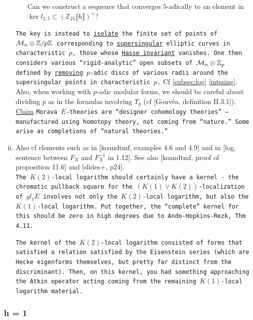 \documentclass{rs}
\theoremstyle{definition}
\theoremstyle{remark}
\newcommand{\mb}[1]{\mathbb{#1}}
\newcommand{\CM}{{\cal M}}
\newcommand{\BZ}{{\mb Z}}
\newcommand{\lb}{\llbracket}
\newcommand{\rb}{\rrbracket}
\renewcommand{\=}{\approx}
\renewcommand{\-}{\sim}
\numberwithin{equation}{section}
\numberwithin{thm}{section}
\begin{document}
\begin{enumerate}[(i)]
\begin{itemize}
  Can we construct a sequence that converges $5$-adically to an element in 
  $\ker l_{2,5} \subset \left( \BZ_{25} \lb h \rb \right)^\times$?  
 \end{itemize}

 \texttt{The key is instead to \underline{isolate} the finite set of points of $\CM_n \otimes \BZ/p\BZ$ 
 corresponding to \underline{supersingular} elliptic curves in characteristic $p$, 
 those whose \underline{Hasse invariant} vanishes.  
 One then considers various ``rigid-analytic'' open subsets of $\CM_n \otimes \BZ_p$ 
 defined by \underline{removing} $p$-adic discs of various radii around the supersingular points in characteristic $p$.}  
 Cf \ref{subsec:log} \eqref{intssing}.  \\

 Also, when working with $p$-adic modular forms, we should be careful about 
 dividing $p$ as in the formulas involving $T_p$ (cf [Gouv\^ea, definition 
 II.3.1]).  \\

 \underline{Claim} \quad
 \texttt{Morava $E$-theories are ``designer cohomology theories'' -- manufactured using homotopy theory, not coming from ``nature.''  
 Some arise as completions of ``natural theories.''  }

 \item Also cf elements such as in [koandtmf, examples 4.6 and 4.9] 
 and in [log, sentence between $F_X$ and $F_X^{-1}$ in 1.12].  
 See also [koandtmf, proof of proposition 11.6] and [slides+, p24].  \\

 \texttt{The $K(2)$-local logarithm should certainly have a kernel - 
 the chromatic pullback square for the $(K(1) \vee K(2))$-localization of $gl_1 E$ 
 involves not only the $K(2)$-local logarithm, but also the $K(1)$-local logarithm.  
 Put together, the ``complete'' kernel for this should be zero in high degrees due to Ando-Hopkins-Rezk, Thm 4.11.  }

 \texttt{The kernel of the $K(2)$-local logarithm consisted of forms that satisfied a relation satisfied by the Eisenstein series 
 (which are Hecke eigenforms themselves, but pretty far distinct from the discriminant).  
 Then, on this kernel, you had something approaching the Atkin operator acting coming from the remaining $K(1)$-local logarithm material.  }
\end{enumerate}


\subsubsection{h = 1}
\end{document}
